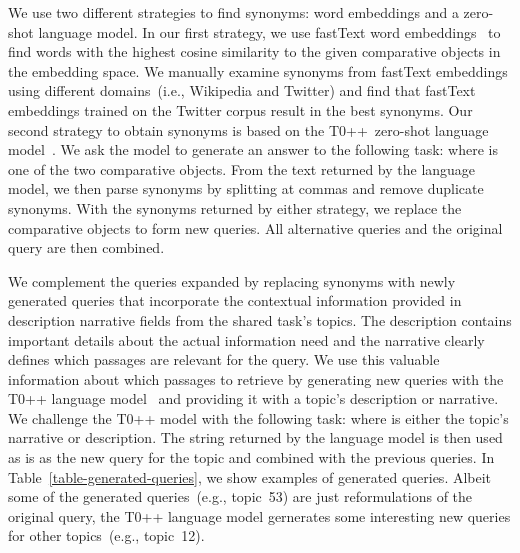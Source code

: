 We use two different strategies to find synonyms: \Ni word embeddings and \Nii a zero-shot language model.
In our first strategy, we use fastText word embeddings~\cite{BojanowskiGJM2017} to find words with the highest cosine similarity to the given comparative objects in the embedding space.
We manually examine synonyms from fastText embeddings using different domains~(i.e., Wikipedia and Twitter) and find that fastText embeddings trained on the Twitter corpus result in the best synonyms.
Our second strategy to obtain synonyms is based on the T0++~zero-shot language model~\cite{SanhWRBSACSLRDBXTSSKCNDCJWMSYPBWNRSSFFTBGBWR2021}.
We ask the model to generate an answer to the following task:  where  is one of the two comparative objects.
From the text returned by the language model, we then parse synonyms by splitting at commas and remove duplicate synonyms.
With the synonyms returned by either strategy, we replace the comparative objects to form new queries. All alternative queries and the original query are then combined.


We complement the queries expanded by replacing synonyms with newly generated queries that incorporate the contextual information provided in description narrative fields from the shared task's topics.
The description contains important details about the actual information need and the narrative clearly defines which passages are relevant for the query.
We use this valuable information about which passages to retrieve by generating new queries with the T0++ language model~\cite{SanhWRBSACSLRDBXTSSKCNDCJWMSYPBWNRSSFFTBGBWR2021} and providing it with a topic's description or narrative.
We challenge the T0++ model with the following task:  where  is either the topic's narrative or description.
The string returned by the language model is then used as is as the new query for the topic and combined with the previous queries.
In Table~\ref{table-generated-queries}, we show examples of generated queries.
Albeit some of the generated queries~(e.g., topic~53) are just reformulations of the original query, the T0++ language model gernerates some interesting new queries for other topics~(e.g., topic~12).


